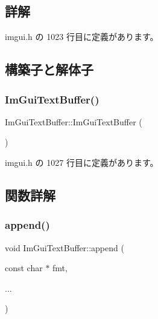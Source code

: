 \subsection{詳解}


 imgui.\+h の 1023 行目に定義があります。



\subsection{構築子と解体子}
\mbox{\label{struct_im_gui_text_buffer_a4c4369c5e65f591554428b947c498d0d}} 
\subsubsection{\texorpdfstring{Im\+Gui\+Text\+Buffer()}{ImGuiTextBuffer()}}
{\footnotesize\ttfamily Im\+Gui\+Text\+Buffer\+::\+Im\+Gui\+Text\+Buffer (\begin{DoxyParamCaption}{ }\end{DoxyParamCaption})\hspace{0.3cm}{\ttfamily [inline]}}



 imgui.\+h の 1027 行目に定義があります。



\subsection{関数詳解}
\mbox{\label{struct_im_gui_text_buffer_a791ac3e5638c58b53772e14bee1323db}} 
\subsubsection{\texorpdfstring{append()}{append()}}
{\footnotesize\ttfamily void Im\+Gui\+Text\+Buffer\+::append (\begin{DoxyParamCaption}\item[{const char $\ast$}]{fmt,  }\item[{}]{... }\end{DoxyParamCaption})}



